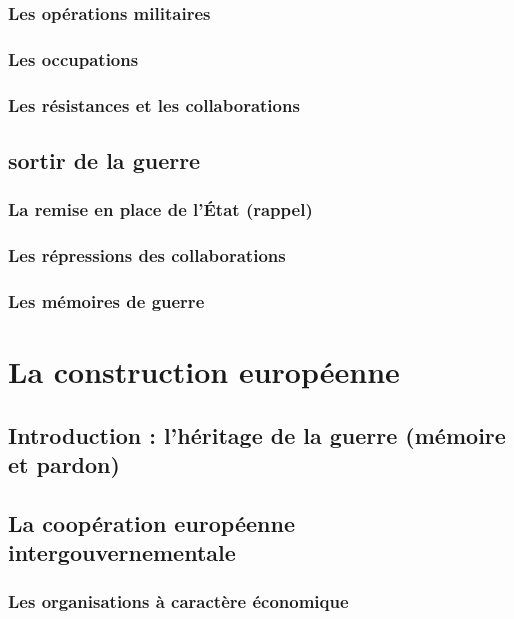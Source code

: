 \documentclass[12pt]{report}
\begin{document}
\subsection{Les opérations militaires}

\subsection{Les occupations}

\subsection{Les résistances et les collaborations}

\section{sortir de la guerre}

\subsection{La remise en place de l'État (rappel)}

\subsection{Les répressions des collaborations}

\subsection{Les mémoires de guerre}


\chapter{La construction européenne}

\section*{Introduction : l'héritage de la guerre (mémoire et pardon)}

\section{La coopération européenne intergouvernementale}

\subsection{Les organisations à caractère économique}
\end{document}

